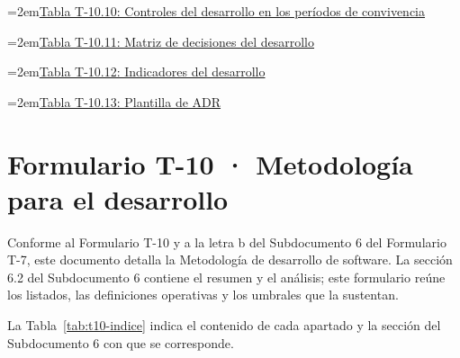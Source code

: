 \documentclass[11pt]{article}
\begin{document}
\noindent\hangindent=2em\hyperref[tab:t10-etapas]{Tabla T-10.10: Controles del desarrollo en los períodos de convivencia}\dotfill\pageref{tab:t10-etapas}\par\vspace{0.4\baselineskip}
\noindent\hangindent=2em\hyperref[tab:t10-decisiones]{Tabla T-10.11: Matriz de decisiones del desarrollo}\dotfill\pageref{tab:t10-decisiones}\par\vspace{0.4\baselineskip}
\noindent\hangindent=2em\hyperref[tab:t10-indicadores]{Tabla T-10.12: Indicadores del desarrollo}\dotfill\pageref{tab:t10-indicadores}\par\vspace{0.4\baselineskip}
\noindent\hangindent=2em\hyperref[tab:t10-adr]{Tabla T-10.13: Plantilla de ADR}\dotfill\pageref{tab:t10-adr}\par\vspace{0.4\baselineskip}
\clearpage


\renewcommand{\tablename}{Tabla}
\renewcommand{\thetable}{T-10.\arabic{table}}

\section{Formulario T-10 · Metodología para el desarrollo}\label{formulario-t-10}

Conforme al Formulario T-10 y a la letra b del Subdocumento 6 del Formulario T-7, este documento detalla la Metodología de desarrollo de software. La sección 6.2 del Subdocumento 6 contiene el resumen y el análisis; este formulario reúne los listados, las definiciones operativas y los umbrales que la sustentan.

La Tabla~\mbox{\ref{tab:t10-indice}} indica el contenido de cada apartado y la sección del Subdocumento 6 con que se corresponde.
\end{document}
